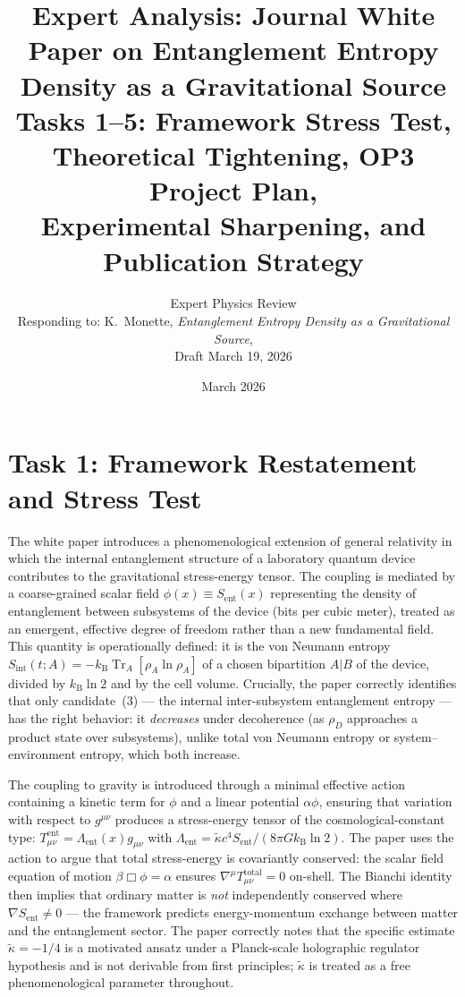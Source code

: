 \documentclass[12pt,letterpaper]{article}
\title{\textbf{Expert Analysis: Journal White Paper on Entanglement Entropy Density as a Gravitational Source}\\[6pt]
\large Tasks 1--5: Framework Stress Test, Theoretical Tightening, OP3 Project Plan,\\
Experimental Sharpening, and Publication Strategy}
\author{Expert Physics Review\\
\small Responding to: K.\ Monette, \textit{Entanglement Entropy Density as a Gravitational Source},\\
\small Draft March 19, 2026}
\date{March 2026}
\theoremstyle{plain}
\theoremstyle{definition}
\theoremstyle{remark}
\newcommand{\kB}{k_{\mathrm{B}}}
\newcommand{\kt}{\tilde{\kappa}}
\newcommand{\Sent}{S_{\mathrm{ent}}}
\newcommand{\tr}{\operatorname{Tr}}
\newcommand{\sint}{S_{\mathrm{int}}}
\begin{document}
\maketitle

\tableofcontents
\newpage

\section*{Task 1: Framework Restatement and Stress Test}
\label{sec:task1}

The white paper introduces a phenomenological extension of general relativity in which the internal entanglement structure of a laboratory quantum device contributes to the gravitational stress-energy tensor. The coupling is mediated by a coarse-grained scalar field $\phi(x) \equiv \Sent(x)$ representing the density of entanglement between subsystems of the device (bits per cubic meter), treated as an emergent, effective degree of freedom rather than a new fundamental field. This quantity is operationally defined: it is the von Neumann entropy $\sint(t;A) = -\kB\tr_A[\rho_A\ln\rho_A]$ of a chosen bipartition $A|B$ of the device, divided by $\kB\ln 2$ and by the cell volume. Crucially, the paper correctly identifies that only candidate~(3) --- the internal inter-subsystem entanglement entropy --- has the right behavior: it \emph{decreases} under decoherence (as $\rho_D$ approaches a product state over subsystems), unlike total von Neumann entropy or system--environment entropy, which both increase.

The coupling to gravity is introduced through a minimal effective action containing a kinetic term for $\phi$ and a linear potential $\alpha\phi$, ensuring that variation with respect to $g^{\mu\nu}$ produces a stress-energy tensor of the cosmological-constant type: $T^{\mathrm{ent}}_{\mu\nu} = \Lambda_{\mathrm{ent}}(x)g_{\mu\nu}$ with $\Lambda_{\mathrm{ent}} = \tilde{\kappa}c^4\Sent/(8\pi G\kB\ln 2)$. The paper uses the action to argue that total stress-energy is covariantly conserved: the scalar field equation of motion $\beta\Box\phi = \alpha$ ensures $\nabla^\mu T^{\mathrm{total}}_{\mu\nu} = 0$ on-shell. The Bianchi identity then implies that ordinary matter is \emph{not} independently conserved where $\nabla\Sent \neq 0$ --- the framework predicts energy-momentum exchange between matter and the entanglement sector. The paper correctly notes that the specific estimate $\kt = -1/4$ is a motivated ansatz under a Planck-scale holographic regulator hypothesis and is not derivable from first principles; $\kt$ is treated as a free phenomenological parameter throughout.
\end{document}
